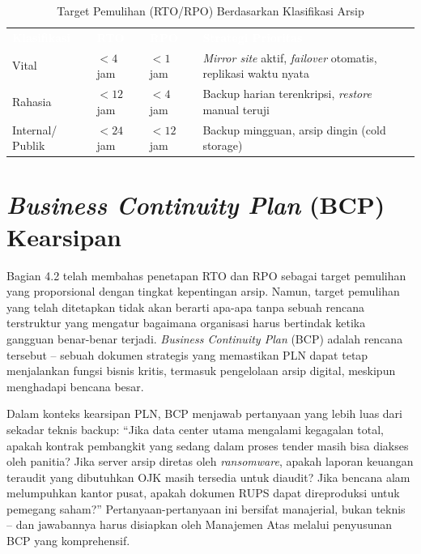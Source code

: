 \documentclass[12pt,a4paper]{report}
\begin{document}
\begin{table}[htbp]
\centering
\small
\caption{Target Pemulihan (RTO/RPO) Berdasarkan Klasifikasi Arsip}
\label{tab:rto-rpo}
\renewcommand{\arraystretch}{1.5}
\begin{tabularx}{\textwidth}{@{} >{\raggedright\arraybackslash}p{2.2cm} P{2.5cm} P{2.5cm} X @{}}
\textcolor{white}{\textbf{Klasifikasi}} & \textcolor{white}{\textbf{RTO}} & \textcolor{white}{\textbf{RPO}} & \textcolor{white}{\textbf{Strategi Prioritas}} \\
Vital & $< 4$ jam & $< 1$ jam & \textit{Mirror site} aktif, \textit{failover} otomatis, replikasi waktu nyata \\
Rahasia & $< 12$ jam & $< 4$ jam & Backup harian terenkripsi, \textit{restore} manual teruji \\
Internal/ Publik & $< 24$ jam & $< 12$ jam & Backup mingguan, arsip dingin (cold storage) \\
\bottomrule
\end{tabularx}
\end{table}

\section{\textit{Business Continuity Plan} (BCP) Kearsipan}

\small Bagian 4.2 telah membahas penetapan RTO dan RPO sebagai target pemulihan yang proporsional dengan tingkat kepentingan arsip. Namun, target pemulihan yang telah ditetapkan tidak akan berarti apa-apa tanpa sebuah rencana terstruktur yang mengatur bagaimana organisasi harus bertindak ketika gangguan benar-benar terjadi. \textit{Business Continuity Plan} (BCP) adalah rencana tersebut -- sebuah dokumen strategis yang memastikan PLN dapat tetap menjalankan fungsi bisnis kritis, termasuk pengelolaan arsip digital, meskipun menghadapi bencana besar.

Dalam konteks kearsipan PLN, BCP menjawab pertanyaan yang lebih luas dari sekadar teknis backup: ``Jika data center utama mengalami kegagalan total, apakah kontrak pembangkit yang sedang dalam proses tender masih bisa diakses oleh panitia? Jika server arsip diretas oleh \textit{ransomware}, apakah laporan keuangan teraudit yang dibutuhkan OJK masih tersedia untuk diaudit? Jika bencana alam melumpuhkan kantor pusat, apakah dokumen RUPS dapat direproduksi untuk pemegang saham?'' Pertanyaan-pertanyaan ini bersifat manajerial, bukan teknis -- dan jawabannya harus disiapkan oleh Manajemen Atas melalui penyusunan BCP yang komprehensif.
\end{document}
